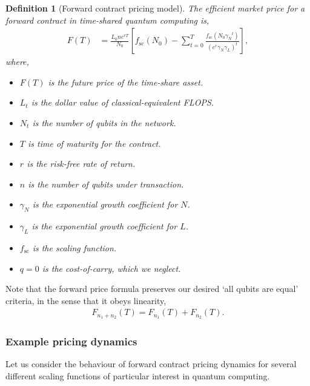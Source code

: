\documentclass[aps, rmp, twocolumn, amsmath, amssymb, nofootinbib, superscriptaddress, longbibliography, floatfix, table-of-contents, eqsecnum]{revtex4-1}
\newtheorem{definition}{Definition}
\begin{document}
\begin{definition}[Forward contract pricing model] \label{def:forward_cont}
The efficient market price for a forward contract in time-shared quantum computing is,
\begin{align}
F(T) &= \frac{L_0 n e^{rT}}{N_0}\left[ f_\text{sc}(N_0) - \sum_{t=0}^T \frac{f_\text{sc}(N_0 {\gamma_N}^{t})}{(e^{r}{\gamma_N}{\gamma_L})^t}\right],
\end{align}
where,
\begin{itemize}
	\item $F(T)$ is the future price of the time-share asset.
	\item $L_t$ is the dollar value of classical-equivalent FLOPS.
	\item $N_t$ is the number of qubits in the network.
	\item $T$ is time of maturity for the contract.
	\item $r$ is the risk-free rate of return.
	\item $n$ is the number of qubits under transaction.
	\item $\gamma_N$ is the exponential growth coefficient for $N$.
	\item $\gamma_L$ is the exponential growth coefficient for $L$.
	\item $f_\text{sc}$ is the scaling function.
	\item \mbox{$q=0$} is the cost-of-carry, which we neglect.
\end{itemize}
\end{definition}

Note that the forward price formula preserves our desired `all qubits are equal' criteria, in the sense that it obeys linearity,
\begin{align}
	F_{n_1+n_2}(T) = F_{n_1}(T) + F_{n_2}(T).
\end{align}

%
%

\subsubsection{Example pricing dynamics}

Let us consider the behaviour of forward contract pricing dynamics for several different scaling functions of particular interest in quantum computing.
\end{document}
